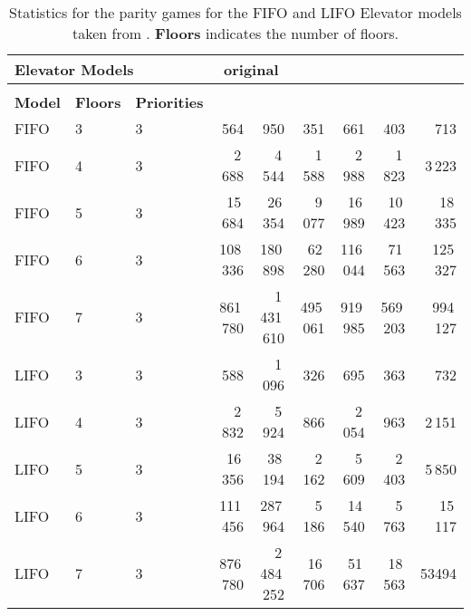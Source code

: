 \documentclass[a4paper]{llncs}
\begin{document}
\begin{table}[!ht]
\caption{Statistics for the parity games for the FIFO and LIFO Elevator models
taken from \cite{FL:09}. \textbf{Floors} indicates the number of floors.}
\label{tab:sizes_pgsolver}
\vspace{-1em}
\setlength{\tabcolsep}{3.5pt}
\begin{tabular}{lll||rr|rr|rr}\\
\multicolumn{3}{l}{\textbf{Elevator Models}}   &
\multicolumn{2}{c}{\textbf{original}} & \multicolumn{2}{c}{} & \multicolumn{2}{c}{} \\
\hline
\hline
& & & \\
\textbf{Model} & \textbf{Floors} & \textbf{Priorities} & 
\textbf{} & \textbf{~} & \textbf{} & \textbf{~} & \textbf{} & \textbf{} \\
\hline 
FIFO & 3 & 3 & 564 & 950 & 351 & 661 & 403 & 713 \\ \hline
FIFO & 4 & 3 & 2\,688 & 4\,544 & 1\,588 & 2\,988 & 1\,823 & 3\,223 \\\hline
FIFO & 5 & 3 & 15\,684 & 26\,354 & 9\,077 & 16\,989 & 10\,423 & 18\,335 
\\\hline
FIFO & 6 & 3 &  108\,336 & 180\,898 & 62\,280 & 116\,044 & 71\,563 & 125\,327 \\\hline
FIFO & 7 & 3 & 861\,780 & 1\,431\,610 & 495\,061 & 919\,985 & 569\,203 & 994\,127 \\\hline
LIFO & 3 & 3 & 588 & 1\,096 & 326 & 695 & 363 & 732 \\\hline
LIFO & 4 & 3 & 2\,832 & 5\,924 & 866 & 2\,054 & 963 & 2\,151 \\\hline
LIFO & 5 & 3 & 16\,356 & 38\,194 & 2\,162 & 5\,609 & 2\,403 & 5\,850 \\\hline
LIFO & 6 & 3 & 111\,456 & 287\,964 & 5\,186 & 14\,540 & 5\,763 & 15\,117 \\\hline
LIFO & 7 & 3 & 876\,780 & 2\,484\,252 & 16\,706 & 51\,637 & 18\,563 &
53494 \\\hline
\end{tabular}
\end{table}
\end{document}
